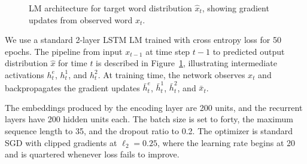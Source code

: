 \begin{figure}
\caption{LM architecture for target word distribution $\hat{x}_t$, showing gradient updates from observed word $x_t$.}
\label{fig:model}
\end{figure}

We use a standard 2-layer LSTM LM trained with cross entropy loss for 50 epochs. 
The pipeline from input $x_{t-1}$ at time step $t-1$ to predicted output distribution $\hat{x}$ for time $t$ is described in Figure~\ref{fig:model}, illustrating intermediate activations $h_t^e$, $h_t^1$, and $h_t^2$. At training time, the network observes $x_t$ and backpropagates the gradient updates $\bar{h}_t^e$, $\bar{h}_t^1$,  $\bar{h}_t^2$, and $\bar{x}_t$. 



The embeddings produced by the encoding layer are 200 units, and the recurrent layers have 200 hidden units each. The batch size is set to forty, the maximum sequence length to 35, and the dropout ratio to 0.2. The optimizer is standard SGD with clipped gradients at $\ell_2 = 0.25$, where the learning rate begins at 20 and is quartered whenever loss fails to improve. 



